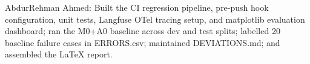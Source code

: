 \item AbdurRehman Ahmed: Built the CI regression pipeline, pre-push hook configuration, unit tests, Langfuse OTel tracing setup, and matplotlib evaluation dashboard; ran the M0+A0 baseline across dev and test splits; labelled 20 baseline failure cases in ERRORS.csv; maintained DEVIATIONS.md; and assembled the LaTeX report.
